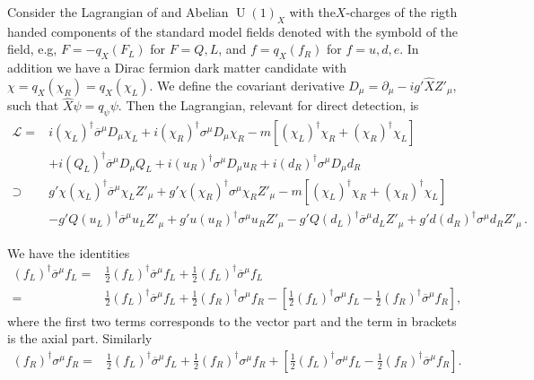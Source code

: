 Consider the Lagrangian of and Abelian $\operatorname{U}(1)_X$ with
the$X$-charges of the rigth handed components of the standard model
fields denoted with the symbold of the field, e.g,
$F=-q_X \left(  F_L  \right)$ for $F=Q,L$, and
$f=q_X \left( f_R \right) $ for $f=u,d,e$. In addition we have a Dirac
fermion dark matter candidate with
$\chi =q_X \left( \chi_R \right)=q_X \left( \chi_L \right)$. We
define the covariant derivative
$D_{\mu}=\partial_{\mu} -i g' \widehat{X} Z'_{\mu}$, such that
$\widehat{X}\psi=q_{\psi}\psi$. Then the Lagrangian, relevant for direct detection, is
\begin{align*}
  \mathcal{L}=&i \left( \chi_L \right)^{\dagger} \overline{\sigma}^{\mu} D_{\mu} \chi_L
                +i \left( \chi_R \right)^{\dagger} {\sigma}^{\mu} D_{\mu} \chi_R
                -m \left[\left( \chi_L \right)^{\dagger} \chi_R+\left( \chi_R \right)^{\dagger} \chi_L\right]
                \nonumber\\
                &
                + i \left( Q_L \right)^{\dagger} \overline{\sigma}^{\mu} D_{\mu} Q_L
                +i \left( u_R \right)^{\dagger} {\sigma}^{\mu} D_{\mu} u_R
                +i \left( d_R \right)^{\dagger} {\sigma}^{\mu} D_{\mu} d_R
                 \nonumber\\ %
  \supset& g'\chi \left( \chi_L \right)^{\dagger}  \overline{\sigma}^{\mu}\chi_L Z'_{\mu}
           +g'\chi\left( \chi_R \right)^{\dagger} {\sigma}^{\mu}  \chi_R Z'_{\mu}-m \left[\left( \chi_L \right)^{\dagger} \chi_R+
                \left( \chi_R \right)^{\dagger} \chi_L\right] \nonumber\\
  &-g'Q \left( u_L \right)^{\dagger} \overline{\sigma}^{\mu} u_L Z'_{\mu}
    +g'u \left( u_R \right)^{\dagger} {\sigma}^{\mu}  u_R Z'_{\mu}
-g'Q \left( d_L \right)^{\dagger} \overline{\sigma}^{\mu} d_L Z'_{\mu}
  +g'd \left( d_R \right)^{\dagger} {\sigma}^{\mu}  d_R Z'_{\mu}\,.
\end{align*}

We have the identities
\begin{align}
  \left( f_{L} \right)^{\dagger}\overline{\sigma}^{\mu} f_L=&  \frac{1}{2}\left( f_{L} \right)^{\dagger}\overline{\sigma}^{\mu} f_L
                                                        + \frac{1}{2}\left( f_{L} \right)^{\dagger}\overline{\sigma}^{\mu} f_L \nonumber\\
  =&  \frac{1}{2}\left( f_L \right)^{\dagger}\overline{\sigma}^{\mu} f_L+\frac{1}{2}\left( f_R \right)^{\dagger}{\sigma}^{\mu} f_R
     -\left[ \frac{1}{2}\left( f_L \right)^{\dagger}{\sigma}^{\mu} f_L- \frac{1}{2}\left( f_R \right)^{\dagger}\overline{\sigma}^{\mu} f_R \right],
\end{align}
where the first two terms corresponds to the vector part and the term in brackets is the axial part. Similarly
\begin{align}
   \left( f_{R} \right)^{\dagger}{\sigma}^{\mu} f_R  =&  \frac{1}{2}\left( f_L \right)^{\dagger}\overline{\sigma}^{\mu} f_L+\frac{1}{2}\left( f_R \right)^{\dagger}{\sigma}^{\mu} f_R
     +\left[ \frac{1}{2}\left( f_L \right)^{\dagger}{\sigma}^{\mu} f_L- \frac{1}{2}\left( f_R \right)^{\dagger}\overline{\sigma}^{\mu} f_R \right].
\end{align}

